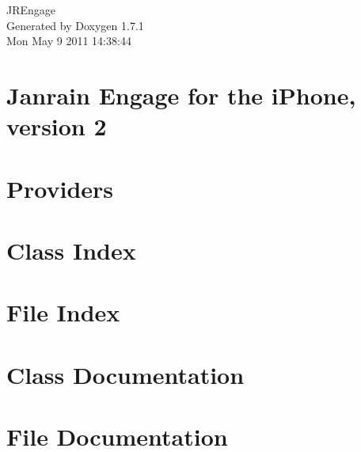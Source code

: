 \documentclass[a4paper]{book}
\begin{document}
\hypersetup{pageanchor=false}
\begin{titlepage}
\vspace*{7cm}
\begin{center}
{\Large JREngage }\\
\vspace*{1cm}
{\large Generated by Doxygen 1.7.1}\\
\vspace*{0.5cm}
{\small Mon May 9 2011 14:38:44}\\
\end{center}
\end{titlepage}
\clearemptydoublepage
{}
\tableofcontents
\clearemptydoublepage
{}
\hypersetup{pageanchor=true}
\chapter{Janrain Engage for the iPhone, version 2}
\label{index}\hypertarget{index}{}
\chapter{Providers}
\label{Providers}
\hypertarget{Providers}{}

\chapter{Class Index}

\chapter{File Index}

\chapter{Class Documentation}









\chapter{File Documentation}

\printindex
\end{document}

